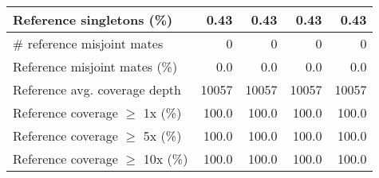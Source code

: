 \documentclass[12pt,a4paper]{article}
\begin{document}
\begin{table}[ht]
\begin{center}
\begin{tabular}{|l*{4}{|r}|}
Reference singletons (\%) & 0.43 & 0.43 & 0.43 & 0.43 \\ \hline
\# reference misjoint mates & 0 & 0 & 0 & 0 \\ \hline
Reference misjoint mates (\%) & 0.0 & 0.0 & 0.0 & 0.0 \\ \hline
Reference avg. coverage depth & 10057 & 10057 & 10057 & 10057 \\ \hline
Reference coverage $\geq$ 1x (\%) & 100.0 & 100.0 & 100.0 & 100.0 \\ \hline
Reference coverage $\geq$ 5x (\%) & 100.0 & 100.0 & 100.0 & 100.0 \\ \hline
Reference coverage $\geq$ 10x (\%) & 100.0 & 100.0 & 100.0 & 100.0 \\ \hline
\end{tabular}
\end{center}
\end{table}
\end{document}
